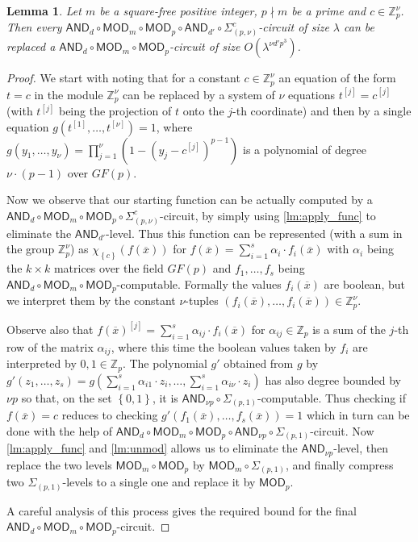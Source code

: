 \documentclass[11pt,a4paper]{amsart}
\newtheorem{lm}{Lemma}[section]
\newcommand{\set}[1]{{\left\{ {#1} \right\} }}
\renewcommand{\o}[1]{\overline {#1}}
\newcommand{\z}{\mathbb{Z}}
\newcommand{\sumpk}[2]{\Sigma_{(#1,#2)}}
\newcommand{\ccc}{c}    \newcommand{\s}{s}
\newcommand{\ccand}{\mathsf{AND}}
\newcommand{\ccmod}{\mathsf{MOD}}
\begin{document}
\begin{lm}\label{lm:5to3}
Let $m$ be a square-free positive integer, $p\nmid m$ be a prime and $\ccc\in\z_p^\nu$.
Then every $\ccand_d\circ\ccmod_m\circ\ccmod_p
\circ\ccand_{d'}\circ\sumpk{p}{\nu}^{\ccc}$-circuit of size $\lambda$
can be replaced a
$\ccand_d\circ\ccmod_m\circ\ccmod_p$-circuit
of size $O(\lambda^{\nu d'p^3})$.
\end{lm}
\begin{proof}
We start with noting that for a constant $c\in \z_p^\nu$
an equation of the form $t=c$ in the module $\z_p^\nu$
can be replaced by a system of $\nu$ equations $t^{[j]}=c^{[j]}$
(with $t^{[j]}$ being the projection of $t$ onto the $j$-th coordinate)
and then by a single equation $g(t^{[1]},\ldots,t^{[\nu]})=1$, where
\(
g(y_1,\ldots,y_\nu)= \prod_{j=1}^\nu (1-(y_j-c^{[j]})^{p-1})
\)
is a polynomial of degree $\nu\cdot (p-1)$ over $GF(p)$.

Now we observe that our starting function can be actually computed by a
$\ccand_d\circ\ccmod_m\circ\ccmod_p\circ\sumpk{p}{\nu}^{\ccc}$-circuit, by simply
using \cref{lm:apply_func} to eliminate the $\ccand_{d'}$-level.
Thus this function can be represented (with a sum in the group $\z_p^\nu$) as
$\chi_\set{c}(f(\o x))$ for
\(
f(\o x) = \sum_{i=1}^{s} \alpha_i\cdot f_i(\o x)
\)
with $\alpha_i$ being the $k\times k$ matrices over the field $GF(p)$
and $f_1,\ldots,f_s$ being $\ccand_d\circ\ccmod_m\circ\ccmod_p$-computable.
Formally the values $f_i(\o x)$ are boolean,
but we interpret them by the constant $\nu$-tuples $(f_i(\o x),\dots,f_i(\o x))\in\z_p^\nu$.

Observe also that $f(\o x)^{[j]}=\sum_{i=1}^{s} \alpha_{ij}\cdot f_i(\o x)$ for $\alpha_{ij}\in\z_p$ is a sum of the $j$-th row of the matrix $\alpha_{ij}$,
where this time the boolean values taken by $f_i$ are interpreted by $0,1\in\z_p$.
The polynomial $g'$ obtained from $g$ by
\(
g'(z_1,\ldots,z_s)=g(\sum_{i=1}^{s} \alpha_{i1}\cdot z_i,\ldots,\sum_{i=1}^{s}\alpha_{i\nu}\cdot z_i)
\)
has also degree bounded by $\nu p$ so that, on the set $\set{0,1}$,
it is $\ccand_{\nu p}\circ\sumpk{p}{1}$-computable.
Thus checking if $f(\o x)=\ccc$ reduces to checking $g'(f_1(\o x),\ldots,f_s(\o x))=1$
which in turn can be done with the help of $\ccand_d\circ\ccmod_m\circ\ccmod_p
\circ\ccand_{\nu p}\circ\sumpk{p}{1}$-circuit.
Now \cref{lm:apply_func} and \cref{lm:unmod} allows us to eliminate the $\ccand_{\nu p}$-level,
then replace the two levels $\ccmod_m\circ\ccmod_p$ by $\ccmod_m\circ\sumpk{p}{1}$,
and finally compress two $\sumpk{p}{1}$-levels to a single one and replace it by $\ccmod_p$.

A careful analysis of this process gives the required bound for the final
$\ccand_d\circ\ccmod_m\circ\ccmod_p$-circuit.
\end{proof}
\end{document}
